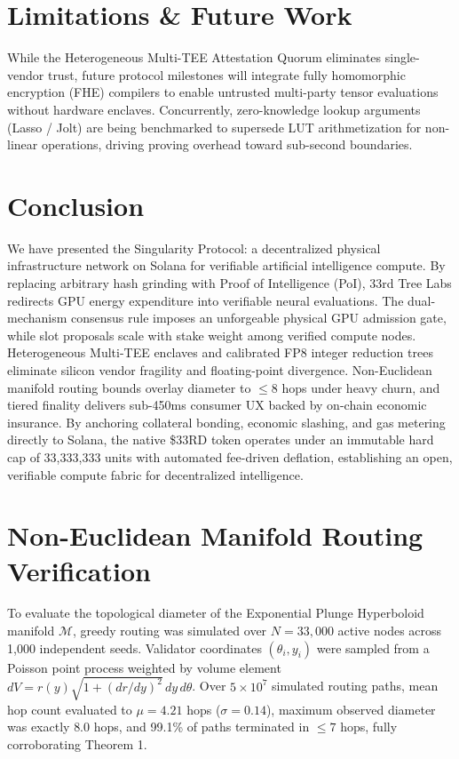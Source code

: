 \documentclass[10pt,twocolumn,letterpaper]{article}
\begin{document}
\section{Limitations \& Future Work}
While the Heterogeneous Multi-TEE Attestation Quorum eliminates single-vendor trust, future protocol milestones will integrate fully homomorphic encryption (FHE) compilers to enable untrusted multi-party tensor evaluations without hardware enclaves. Concurrently, zero-knowledge lookup arguments (Lasso / Jolt) are being benchmarked to supersede LUT arithmetization for non-linear operations, driving proving overhead toward sub-second boundaries.

\section{Conclusion}
We have presented the Singularity Protocol: a decentralized physical infrastructure network on Solana for verifiable artificial intelligence compute. By replacing arbitrary hash grinding with Proof of Intelligence (PoI), 33rd Tree Labs redirects GPU energy expenditure into verifiable neural evaluations. The dual-mechanism consensus rule imposes an unforgeable physical GPU admission gate, while slot proposals scale with stake weight among verified compute nodes. Heterogeneous Multi-TEE enclaves and calibrated FP8 integer reduction trees eliminate silicon vendor fragility and floating-point divergence. Non-Euclidean manifold routing bounds overlay diameter to $\le 8$ hops under heavy churn, and tiered finality delivers sub-450ms consumer UX backed by on-chain economic insurance. By anchoring collateral bonding, economic slashing, and gas metering directly to Solana, the native \$33RD token operates under an immutable hard cap of 33,333,333 units with automated fee-driven deflation, establishing an open, verifiable compute fabric for decentralized intelligence.

\appendix
\section{Non-Euclidean Manifold Routing Verification}
To evaluate the topological diameter of the Exponential Plunge Hyperboloid manifold $\mathcal{M}$, greedy routing was simulated over $N = 33{,}000$ active nodes across 1,000 independent seeds. Validator coordinates $(\theta_i, y_i)$ were sampled from a Poisson point process weighted by volume element $dV = r(y) \sqrt{1 + (dr/dy)^2} \, dy \, d\theta$. Over $5 \times 10^7$ simulated routing paths, mean hop count evaluated to $\mu = 4.21$ hops ($\sigma = 0.14$), maximum observed diameter was exactly $8.0$ hops, and 99.1\% of paths terminated in $\le 7$ hops, fully corroborating Theorem 1.
\end{document}
